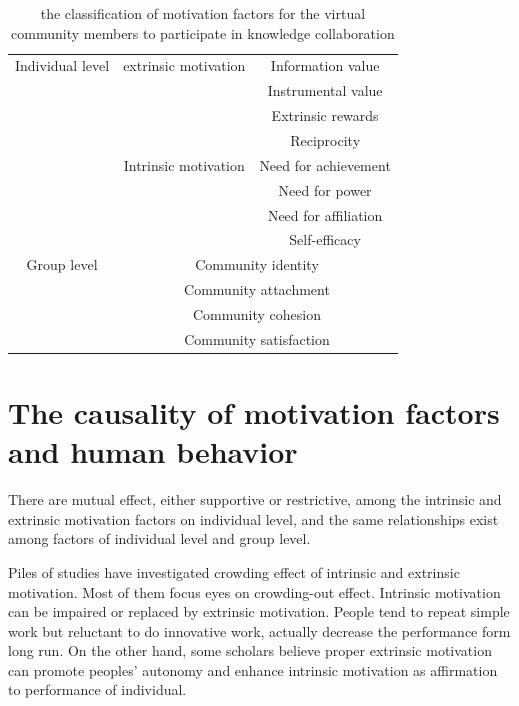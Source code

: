 \documentclass{elsarticle}
\begin{document}
\begin{table}[htpb]
  \label{tab:individual-level}
  \centering
   \caption{the classification of motivation factors for the virtual
    community members to participate in knowledge collaboration}
\begin{tabular}{ccc}
    \toprule
    \multicolumn{ 1}{c|}{Individual level} & \multicolumn{ 1}{|c|}{extrinsic motivation} & Information value \\
    \multicolumn{ 1}{c|}{} & \multicolumn{ 1}{|c|}{} & Instrumental value \\
    \multicolumn{ 1}{c|}{} & \multicolumn{ 1}{|c|}{} & Extrinsic rewards \\
    \multicolumn{ 1}{c|}{} & \multicolumn{ 1}{|c|}{} & Reciprocity \\\cline{2-3}
    \multicolumn{ 1}{c|}{} & \multicolumn{ 1}{|c|}{Intrinsic motivation} & Need for achievement \\
    \multicolumn{ 1}{c|}{} & \multicolumn{ 1}{|c|}{} & Need for power \\
    \multicolumn{ 1}{c|}{} & \multicolumn{ 1}{|c|}{} & Need for affiliation \\
    \multicolumn{ 1}{c|}{} & \multicolumn{ 1}{|c|}{} & Self-efficacy \\\hline
    \multicolumn{ 1}{c|}{Group level} & \multicolumn{ 2}{|c}{Community identity} \\
    \multicolumn{ 1}{c|}{} & \multicolumn{ 2}{|c}{Community attachment} \\
    \multicolumn{ 1}{c|}{} & \multicolumn{ 2}{|c}{Community cohesion} \\
    \multicolumn{ 1}{c|}{} & \multicolumn{ 2}{|c}{Community satisfaction} \\
    \bottomrule
    \end{tabular}
\end{table}

 

\section{The causality of motivation factors and human behavior}
\label{sec:modeling-process}

There are  mutual effect, either supportive or restrictive, among the
intrinsic and extrinsic motivation factors on individual level, and the same
relationships exist among factors of  individual level and group
level. 

Piles of studies have investigated crowding effect of intrinsic and
extrinsic motivation. Most of them focus eyes on crowding-out
effect. Intrinsic motivation can be impaired or replaced by extrinsic
motivation\cite{bul-125-6-62719991101}\cite{deci2000agp}\cite{kasser2002hpm}. People
tend to repeat simple work but reluctant to do innovative work\cite{amabile1998kc}\cite{schwartz1993cad},
actually decrease the performance form long
run\cite{Kruglanski1978}. On the other hand, some scholars believe proper
extrinsic motivation can promote peoples' autonomy and enhance
intrinsic motivation as affirmation to  performance of individual\cite{eisenberger1999eri}\cite{eisenberger1999dpp}\cite{eisenberger1997csr}.          
\end{document}
